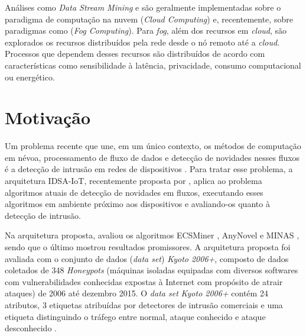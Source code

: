 
Análises como \emph{Data Stream Mining} e \nd
são geralmente implementadas
sobre o paradigma de computação na nuvem
(\emph{Cloud Computing}) e, recentemente, sobre paradigmas
como 
(\emph{Fog Computing}).
Para \emph{fog}, além dos recursos em \emph{cloud}, são
explorados os recursos distribuídos pela rede desde o nó remoto até a
\emph{cloud}. Processos que dependem desses recursos são distribuídos de acordo
com características como sensibilidade à latência, privacidade,
consumo computacional ou energético.

\section{Motivação}\label{sec:motivo}

\newcommand{\idsiot}{IDSA-IoT\xspace}
\newcommand{\fog}{\emph{fog computing}\xspace}

Um problema recente que une, em um único contexto, os métodos de computação em
névoa, processamento de fluxo de dados e detecção de novidades nesses fluxos é a
detecção de intrusão em redes de dispositivos \iot.
Para tratar esse problema, a arquitetura \idsiot, recentemente proposta por
, aplica ao problema algoritmos atuais de detecção de
novidades em fluxos, executando esses algoritmos em ambiente próximo aos
dispositivos e avaliando-os quanto à detecção de intrusão.

Na arquitetura proposta,  avaliou os algoritmos
ECSMiner \cite{Masud2010ECSMiner}, AnyNovel \cite{Abdallah2016anynovel} e MINAS
\cite{Faria2015minas}, sendo que o último mostrou resultados promissores.
A arquitetura proposta foi avaliada com o conjunto de dados (\emph{data set})
\emph{Kyoto 2006+}, composto de dados coletados de 348 \emph{Honeypots}
(máquinas isoladas equipadas com diversos softwares com vulnerabilidades
conhecidas expostas à Internet com propósito de atrair ataques) de 2006 até
dezembro 2015.
O \emph{data set} \emph{Kyoto 2006+} contém 24 atributos, 3 etiquetas atribuídas por
detectores de intrusão comerciais e uma etiqueta
distinguindo o tráfego entre normal, ataque conhecido e ataque desconhecido
\cite{Cassales2019a}.

